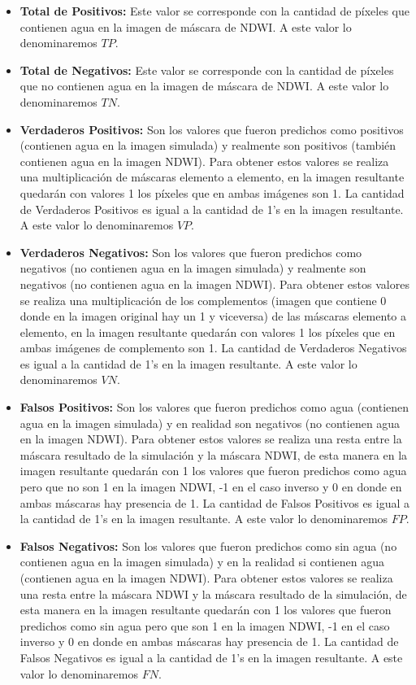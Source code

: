 \documentclass[10pt,a4paper, twoside]{report}
\begin{document}
\begin{itemize}
	\item \textbf{Total de Positivos:} Este valor se corresponde con la cantidad de píxeles que contienen agua en la imagen de máscara de NDWI. A este valor lo denominaremos $TP$.
	\item \textbf{Total de Negativos:} Este valor se corresponde con la cantidad de píxeles que no contienen agua en la imagen de máscara de NDWI. A este valor lo denominaremos $TN$.
	\item \textbf{Verdaderos Positivos:} Son los valores que fueron predichos como positivos (contienen agua en la imagen simulada) y realmente son positivos (también contienen agua en la imagen NDWI).
Para obtener estos valores se realiza una multiplicación de máscaras elemento a elemento, en la imagen resultante quedarán con valores 1 los píxeles que en ambas imágenes son 1.
La cantidad de Verdaderos Positivos es igual a la cantidad de 1's en la imagen resultante. A este valor lo denominaremos $VP$.
	\item \textbf{Verdaderos Negativos:} Son los valores que fueron predichos como negativos (no contienen agua en la imagen simulada) y realmente son negativos (no contienen agua en la imagen NDWI).
Para obtener estos valores se realiza una multiplicación de los complementos (imagen que contiene 0 donde en la imagen original hay un 1 y viceversa) de las máscaras elemento a elemento, en la imagen resultante quedarán con valores 1 los píxeles que en ambas imágenes de complemento son 1.
La cantidad de Verdaderos Negativos es igual a la cantidad de 1's en la imagen resultante. A este valor lo denominaremos $VN$.
	\item \textbf{Falsos Positivos:} Son los valores que fueron predichos como agua (contienen agua en la imagen simulada) y en realidad son negativos (no contienen agua en la imagen NDWI).
Para obtener estos valores se realiza una resta entre la máscara resultado de la simulación y la máscara NDWI, de esta manera en la imagen resultante quedarán con 1 los valores que fueron predichos como agua pero que no son 1 en la imagen NDWI, -1 en el caso inverso y 0 en donde en ambas máscaras hay presencia de 1.
La cantidad de Falsos Positivos es igual a la cantidad de 1's en la imagen resultante. A este valor lo denominaremos $FP$.
	\item \textbf{Falsos Negativos:} Son los valores que fueron predichos como sin agua (no contienen agua en la imagen simulada) y en la realidad si contienen agua (contienen agua en la imagen NDWI).
Para obtener estos valores se realiza una resta entre la máscara NDWI y la máscara resultado de la simulación, de esta manera en la imagen resultante quedarán con 1 los valores que fueron predichos como sin agua pero que son 1 en la imagen NDWI, -1 en el caso inverso y 0 en donde en ambas máscaras hay presencia de 1.
La cantidad de Falsos Negativos es igual a la cantidad de 1's en la imagen resultante. A este valor lo denominaremos $FN$.
\end{itemize}
\end{document}
